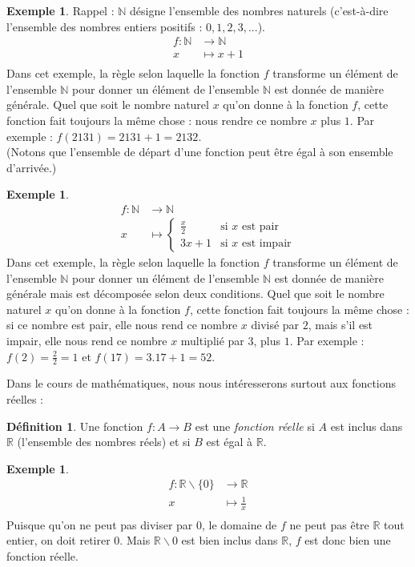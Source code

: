 \documentclass[a4paper,13pt]{scrreprt}
\theoremstyle{plain}
\theoremstyle{definition}
\newtheorem{déf}[subsection]{Définition}
\newtheorem{exe}[subsection]{Exemple}
\newcommand{\nn}{\mathbb{N}}
\newcommand{\rr}{\mathbb{R}}
\begin{document}
\begin{exe}
	Rappel : $\nn$ désigne l'ensemble des nombres naturels (c'est-à-dire l'ensemble des nombres entiers positifs : $0, 1, 2, 3, ...$).
	\begin{align*}
	f : \nn &\to \nn \\
	x &\mapsto x+1 \\
	\end{align*}
	Dans cet exemple, la règle selon laquelle la fonction $f$ transforme un élément de l'ensemble $\nn$ pour donner un élément de l'ensemble $\nn$ est donnée de manière générale. Quel que soit le nombre naturel $x$ qu'on donne à la fonction $f$, cette fonction fait toujours la même chose : nous rendre ce nombre $x$ plus $1$. Par exemple : $f(2131) = 2131 + 1 = 2132$. \\ (Notons que l'ensemble de départ d'une fonction peut être égal à son ensemble d'arrivée.)
\end{exe}
\begin{exe}
	\begin{align*}
	f : \nn &\to \nn \\
	x &\mapsto \begin{cases}
	\frac{x}{2}&\text{si $x$ est pair}\\
	3x+1&\text{si $x$ est impair}
	\end{cases}
	\end{align*}
	Dans cet exemple, la règle selon laquelle la fonction $f$ transforme un élément de l'ensemble $\nn$ pour donner un élément de l'ensemble $\nn$ est donnée de manière générale mais est décomposée selon deux conditions. Quel que soit le nombre naturel $x$ qu'on donne à la fonction $f$, cette fonction fait toujours la même chose : si ce nombre est pair, elle nous rend ce nombre $x$ divisé par $2$, mais s'il est impair, elle nous rend ce nombre $x$ multiplié par $3$, plus $1$. Par exemple : $f(2) = \frac{2}{2} = 1$ et $f(17) = 3.17+1 = 52$.
\end{exe}
Dans le cours de mathématiques, nous nous intéresserons surtout aux fonctions réelles :
\begin{déf}
	Une fonction $f : A \to B$ est une \emph{fonction réelle} si $A$ est inclus dans $\rr$ (l'ensemble des nombres réels) et si $B$ est égal à $\rr$.
\end{déf}
\begin{exe}
	\begin{align*}
	f : {\rr} \backslash \{0\} &\to \rr \\
	x &\mapsto \frac{1}{x} \\
	\end{align*}
	Puisque qu'on ne peut pas diviser par $0$, le domaine de $f$ ne peut pas être $\rr$ tout entier, on doit retirer $0$. Mais ${\rr} \backslash {0}$ est bien inclus dans $\rr$, $f$ est donc bien une fonction réelle.
\end{exe}
\end{document}
